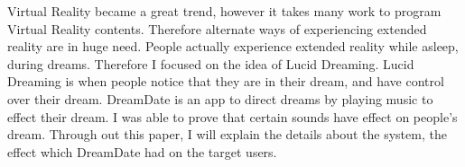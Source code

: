 \begin{jabstract}

\end{jabstract}

\begin{eabstract}
Virtual Reality became a great trend, however it takes many work to program Virtual Reality contents. Therefore alternate ways of experiencing extended reality are in huge need. People actually experience extended reality while asleep, during dreams. Therefore I focused on the idea of Lucid Dreaming. Lucid Dreaming is when people notice that they are in their dream, and have control over their dream. DreamDate is an app to direct dreams by playing music to effect their dream. I was able to prove that certain sounds have effect on people’s dream. Through out this paper, I will explain the details about the system, the effect which DreamDate had on the target users.
\end{eabstract}